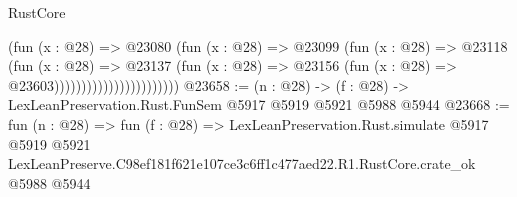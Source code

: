 \begin{lexlean}{RustCore}
\begin{coremodule}
                                      (fun (x : @28) =>
                                      @23080
                                        (fun (x : @28) =>
                                        @23099
                                          (fun (x : @28) =>
                                          @23118
                                            (fun (x : @28) =>
                                            @23137
                                              (fun (x : @28) =>
                                              @23156 (fun (x : @28) => @23603)))))))))))))))))))))))
@23658 := (n : @28) -> (f : @28) -> LexLeanPreservation.Rust.FunSem @5917 @5919 @5921 @5988 @5944
@23668 := fun (n : @28) =>
  fun (f : @28) =>
  LexLeanPreservation.Rust.simulate
    @5917
    @5919
    @5921
    LexLeanPreserve.C98ef181f621e107ce3c6ff1c477aed22.R1.RustCore.crate_ok
    @5988
    @5944
\end{coremodule}
\end{lexlean}
